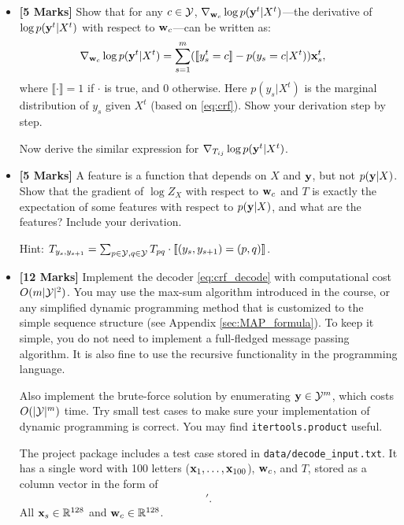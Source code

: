 \documentclass[11pt]{report}
\begin{document}
\begin{itemize}
	\item[(1a)] {\bf [5 Marks]} Show that for any $c \in \mathcal{Y}$, 
	${\nabla}_{\mathbf{\boldsymbol{w}}_c} \log p(\mathbf{\boldsymbol{y}}^t|X^t)$---the derivative of $\log p(\mathbf{\boldsymbol{y}}^t|X^t)$ with respect to $\mathbf{\boldsymbol{w}}_c$---can be written as:
	\begin{align}
		{\nabla}_{\mathbf{\boldsymbol{w}}_c} \log p(\mathbf{\boldsymbol{y}}^t|X^t) & = \sum_{s=1}^m ([\![y^t_s = c]\!] - p(y_s = c | X^t)) \mathbf{\boldsymbol{x}}^t_s,
	\end{align}
	where $\llbracket \cdot \rrbracket = 1$ if $\cdot$ is true, and 0 otherwise.
	Here $p(y_s | X^t)$ is the marginal distribution of $y_s$ given $X^t$ (based on \eqref{eq:crf}).
	Show your derivation step by step.
	
	Now derive the similar expression for ${\nabla}_{T_{ij}} \log p(\mathbf{\boldsymbol{y}}^t|X^t)$.
	
	\item[(1b)] {\bf [5 Marks]} A feature is a function that depends on $X$ and $\mathbf{\boldsymbol{y}}$, but not $p(\mathbf{\boldsymbol{y}}|X)$. Show that the gradient of $\log Z_X$ with respect to $\mathbf{\boldsymbol{w}}_c$ and $T$ is exactly the expectation of some features with respect to $p(\mathbf{\boldsymbol{y}} | X)$, and what are the features? Include your derivation.
	
	Hint: $T_{y_s, y_{s+1}} = \sum_{p \in \mathcal{Y}, q \in \mathcal{Y}} T_{pq} \cdot \llbracket (y_s, y_{s+1}) = (p,q)  \rrbracket$.
	
	\item[(1c)] 
	\label{qn:decoding}
	{\bf [12 Marks]} Implement the decoder \eqref{eq:crf_decode} with computational cost $O(m|\mathcal{Y}|^2)$.
	You may use the max-sum algorithm introduced in the course, or any simplified dynamic programming method that is customized to the simple sequence structure (see Appendix \ref{sec:MAP_formula}). 
	To keep it simple, you do not need to implement a full-fledged message passing algorithm.
	It is also fine to use the recursive functionality in the programming language.
	
	Also implement the brute-force solution by enumerating $\mathbf{\boldsymbol{y}} \in \mathcal{Y}^m$, which costs $O(|\mathcal{Y}|^m)$ time.  Try small test cases to make sure your implementation of dynamic programming is correct.
	You may find \verb#itertools.product# useful.
	
	The project package includes a test case stored in \verb#data/decode_input.txt#.
	It has a single word with 100 letters ($\mathbf{\boldsymbol{x}}_1, \ldots, \mathbf{\boldsymbol{x}}_{100}$), $\mathbf{\boldsymbol{w}}_c$, and $T$, stored as a column vector in the form of
	\begin{align}
		[\xvec'_1, \ldots, \xvec'_{100}, \wvec'_1, \ldots, \wvec'_{26}, T_{1,1}, T_{1,2}, \ldots, T_{1, 26}, T_{2,1}, \ldots, T_{2, 26}, \ldots, T_{26,1}, \ldots, T_{26, 26}]'.
	\end{align}
	All $\mathbf{\boldsymbol{x}}_s \in \mathbb{R}^{128}$ and $\mathbf{\boldsymbol{w}}_c \in \mathbb{R}^{128}$.
	

\end{itemize}
\end{document}
